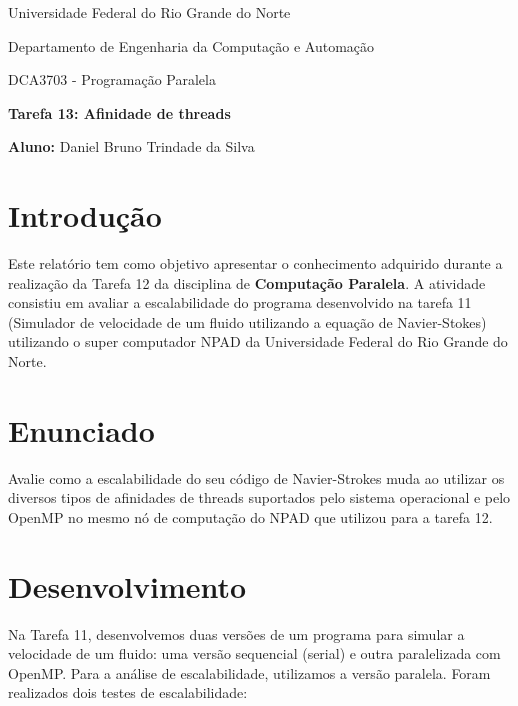 \documentclass[a4paper, 12pt]{article}
\begin{document}
	\begin{center}
		Universidade Federal do Rio Grande do Norte
		
		Departamento de Engenharia da Computação e Automação  
		
		DCA3703 - Programação Paralela  
		
		\textbf{Tarefa 13: Afinidade de threads}  
		
		\textbf{Aluno:} Daniel Bruno Trindade da Silva  
	\end{center}  
	
	\section{Introdução}  
	\hspace{.62cm}Este relatório tem como objetivo apresentar o conhecimento adquirido durante a realização da Tarefa 12 da disciplina de \textbf{Computação Paralela}. A atividade consistiu em avaliar a escalabilidade do programa desenvolvido na tarefa 11 (Simulador de velocidade de um fluido utilizando a equação de Navier-Stokes) utilizando o super computador NPAD da Universidade Federal do Rio Grande do Norte.  
	
	\section{Enunciado}    
	\hspace{.62cm} Avalie como a escalabilidade do seu código de Navier-Strokes muda ao utilizar os diversos tipos de afinidades de threads suportados pelo sistema operacional e pelo OpenMP no mesmo nó de computação do NPAD que utilizou para a tarefa 12.
	
	\section{Desenvolvimento}
	\hspace{.62cm}Na Tarefa 11, desenvolvemos duas versões de um programa para simular a velocidade de um fluido: uma versão sequencial (serial) e outra paralelizada com OpenMP. Para a análise de escalabilidade, utilizamos a versão paralela. Foram realizados dois testes de escalabilidade:
	
	 
\end{document}
